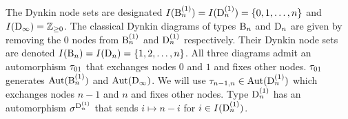 \documentclass[a4paper]{amsart}
\theoremstyle{remark}
\numberwithin{equation}{section}
\begin{document}
\begin{center}
 \end{center}
 The Dynkin node sets are designated $I(\mathrm{B}_{n}^{(1)})=I(\mathrm{D}_{n}^{(1)})=\{0,1,\dots,n\}$ and $I(\mathrm{D}_{\infty})=\mathbb{Z}_{\ge0}$. The classical Dynkin diagrams of types $\mathrm{B}_{n}$ and $\mathrm{D}_{n}$ are given by removing the $0$ nodes from $\mathrm{B}_{n}^{(1)}$ and $\mathrm{D}_{n}^{(1)}$ respectively. Their Dynkin node sets are denoted $I(\mathrm{B}_{n})=I(\mathrm{D}_{n})=\{1,2,\dotsc,n\}$. All three diagrams admit an automorphism $\tau_{01}$ that exchanges nodes $0$ and $1$ and fixes other nodes. $\tau_{01}$ generates $\mathrm{Aut}(\mathrm{B}_{n}^{(1)})$ and $\mathrm{Aut}(\mathrm{D}_{\infty})$. We will use $\tau_{n-1,n}\in \mathrm{Aut}(\mathrm{D}_{n}^{(1)})$ which exchanges nodes $n-1$ and $n$ and fixes other nodes.
Type $\mathrm{D}_{n}^{(1)}$ has an automorphism $\sigma^{\mathrm{D}_{n}^{(1)}}$ that sends $i\mapsto n-i$ for $i\in I(\mathrm{D}_{n}^{(1)})$.
\end{document}
